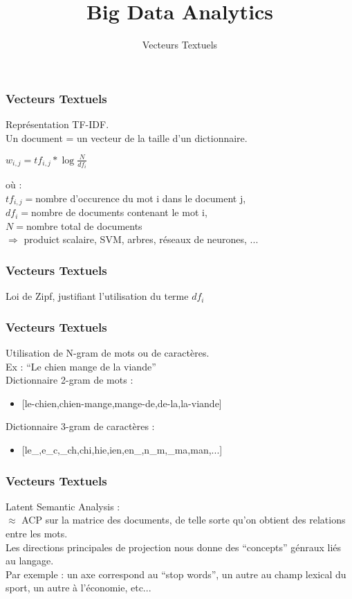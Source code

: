 \documentclass{formation}
\title{Big Data Analytics}
\subtitle{Vecteurs Textuels}
\begin{document}
\maketitle

\begin{frame}
  \frametitle{Vecteurs Textuels}
  Représentation TF-IDF. \\
  Un document = un vecteur de la taille d'un dictionnaire. \\
  \begin{center}
    $\boxed{w_{i,j} = tf_{i,j}*\log{\frac{N}{df_i}}}$
  \end{center}
  où : \\
  $tf_{i,j} = $nombre d'occurence du mot i dans le document j, \\
  $df_i = $nombre de documents contenant le mot i, \\
  $N = $nombre total de documents \\
  \newline
  $\Rightarrow$ produict scalaire, SVM, arbres, réseaux de neurones, ...
\end{frame}

\begin{frame}
  \frametitle{Vecteurs Textuels}
  Loi de Zipf, justifiant l'utilisation du terme $df_i$
\end{frame}

\begin{frame}
  \frametitle{Vecteurs Textuels}
  Utilisation de N-gram de mots ou de caractères. \\
  \newline
  Ex : ``Le chien mange de la viande''\\
  Dictionnaire 2-gram de mots : \\
  \newline
  \begin{itemize}
  \item {[le-chien,chien-mange,mange-de,de-la,la-viande]}
  \end{itemize}
  Dictionnaire 3-gram de caractères :
  \begin{itemize}
  \item {[le\_,e\_c,\_ch,chi,hie,ien,en\_,n\_m,\_ma,man,...]}
  \end{itemize}
\end{frame}

\begin{frame}
  \frametitle{Vecteurs Textuels}
  Latent Semantic Analysis : \\
  \newline
  $\approx$ ACP sur la matrice des documents, de telle sorte qu'on obtient des relations entre les mots. \\
  Les directions principales de projection nous donne des ``concepts'' génraux liés au langage. \\
  \newline
  Par exemple : un axe correspond au ``stop words'', un autre au champ lexical du sport, un autre à l'économie, etc...  
\end{frame}
\end{document}

